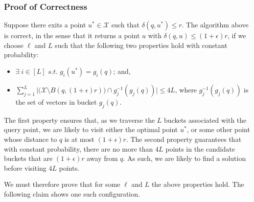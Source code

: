 \subsubsection{Proof of Correctness}

Suppose there exits a point $u^\ast \in \mathcal{X}$ such that
$\delta(q, u^\ast) \leq r$. The algorithm above is correct, in the sense
that it returns a point $u$ with $\delta(q, u) \leq (1+\epsilon)r$,
if we choose $\ell$ and $L$ such that the following two properties hold
with constant probability:
\begin{itemize}
    \item $\exists \;i \in [L] \textit{ s.t. } g_i(u^\ast) = g_i(q)$; and,
    \item $\sum_{j=1}^{L} \Big\lvert \Big( \mathcal{X} \setminus B(q, (1+\epsilon)r) \Big) \cap g_j^{-1}(g_j(q)) \Big\rvert \leq 4L$, where $g_j^{-1}(g_j(q))$ is the set of vectors in bucket $g_j(q)$.
\end{itemize}

The first property ensures that, as we traverse the $L$ buckets associated
with the query point, we are likely to visit either the optimal point $u^\ast$,
or some other point whose distance to $q$ is at most $(1 + \epsilon)r$.
The second property guarantees that with constant probability, there are no more
than $4L$ points in the candidate buckets that are $(1+\epsilon)r$ away from $q$.
As such, we are likely to find a solution before visiting $4L$ points.

We must therefore prove that for some $\ell$ and $L$ the above properties hold.
The following claim shows one such configuration.

